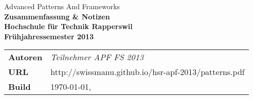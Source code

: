 \begin{titlepage}

	\thispagestyle{empty}
	\BgThispage

	\sffamily\color{titlepagefontcolor}
	\begin{center}
		\Large
		Advanced Patterns And Frameworks\\[5mm]

		\Huge\bfseries
		Zusammenfassung \& Notizen\\[15mm]

		\large\normalfont\sffamily
		Hochschule für Technik Rapperswil\\[1mm]
		Frühjahressemester 2013
	\end{center}
	\vfill

	\begin{multicols}{2}
		\begin{tabularx}{\textwidth}{l X}
			\bfseries Autoren & \textit{Teilnehmer APF FS 2013}\tabularnewline
			\bfseries URL & http://swissmanu.github.io/hsr-apf-2013/patterns.pdf\tabularnewline
			\bfseries Build & \today, \currenttime\tabularnewline
		\end{tabularx}

	\end{multicols}

\end{titlepage}

\restoregeometry